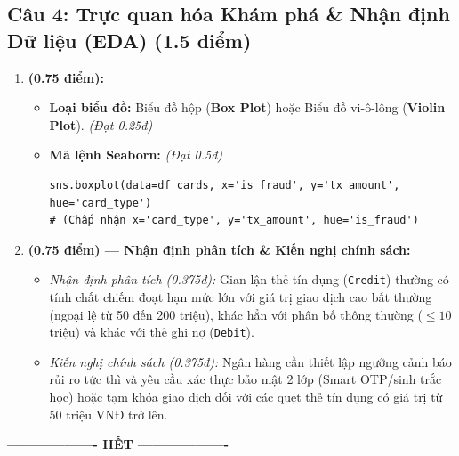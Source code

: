 \documentclass[11pt,a4paper]{article}
\begin{document}
\subsection*{Câu 4: Trực quan hóa Khám phá \& Nhận định Dữ liệu (EDA) (1.5 điểm)}
\begin{enumerate}[label=\textbf{\alph*)}]
  \item \textbf{(0.75 điểm):}
  \begin{itemize}
    \item \textbf{Loại biểu đồ:} Biểu đồ hộp (\textbf{Box Plot}) hoặc Biểu đồ vi-ô-lông (\textbf{Violin Plot}). \textit{(Đạt 0.25đ)}
    \item \textbf{Mã lệnh Seaborn:} \textit{(Đạt 0.5đ)}
\begin{lstlisting}
sns.boxplot(data=df_cards, x='is_fraud', y='tx_amount', hue='card_type')
# (Chấp nhận x='card_type', y='tx_amount', hue='is_fraud')
\end{lstlisting}
  \end{itemize}

  \item \textbf{(0.75 điểm) --- Nhận định phân tích \& Kiến nghị chính sách:}
  \begin{itemize}
    \item \textit{Nhận định phân tích (0.375đ):} Gian lận thẻ tín dụng (\texttt{Credit}) thường có tính chất chiếm đoạt hạn mức lớn với giá trị giao dịch cao bất thường (ngoại lệ từ 50 đến 200 triệu), khác hẳn với phân bố thông thường ($\le 10$ triệu) và khác với thẻ ghi nợ (\texttt{Debit}).
    \item \textit{Kiến nghị chính sách (0.375đ):} Ngân hàng cần thiết lập ngưỡng cảnh báo rủi ro tức thì và yêu cầu xác thực bảo mật 2 lớp (Smart OTP/sinh trắc học) hoặc tạm khóa giao dịch đối với các quẹt thẻ tín dụng có giá trị từ 50 triệu VNĐ trở lên.
  \end{itemize}
\end{enumerate}

\begin{center}
\textbf{------------------- HẾT -------------------}
\end{center}
\end{document}
